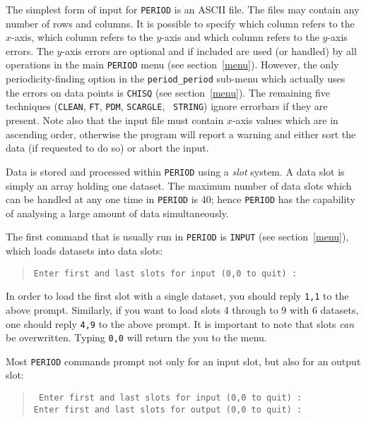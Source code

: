 The simplest form of input for {\tt PERIOD} is an ASCII file.  The
files may contain any number of rows and columns. It is possible to
specify which column refers to the $x$-axis, which column refers to
the $y$-axis and which column refers to the $y$-axis errors.
The $y$-axis errors are optional and if included are used (or handled)
by all operations in the main {\tt PERIOD} menu (see
section~\ref{menu}).  However, the only periodicity-finding option in
the {\tt period\_period} sub-menu which actually uses the errors on
data points is {\tt CHISQ} (see section~\ref{menu}). The remaining five
techniques ({\tt CLEAN}, {\tt FT}, {\tt PDM}, {\tt SCARGLE}, {\tt
STRING}) ignore errorbars if they are present. Note also that the input
file must contain $x$-axis values which are in ascending order,
otherwise the program will report a warning and either sort the data
(if requested to do so) or abort the input.

Data is stored and processed within {\tt PERIOD} using a {\em slot} system.
A data slot is simply an array holding one dataset. The maximum number
of data slots which can be handled at any one time in {\tt PERIOD} is 40;
hence {\tt PERIOD} has the capability of analysing a large amount of data
simultaneously. 

The first command that is usually run in {\tt PERIOD} is {\tt INPUT}
(see section~\ref{menu}), which loads datasets into data slots:

\begin{quote}
{\tt Enter first and last slots for input (0,0 to quit) :}
\end{quote}

In order to load the first slot with a single dataset, you should reply 
{\tt 1,1} to the above prompt. Similarly, if you want to load slots
4 through to 9 with 6 datasets, one should reply {\tt 4,9} to the above
prompt. It is important to note that slots {\em can} be overwritten.
Typing {\tt 0,0} will return the you to the menu. 

Most {\tt PERIOD} commands prompt not only for an input slot, but also for
an output slot:

\begin{quote}{\tt
Enter first and last slots for input  (0,0 to quit) : \\
Enter first and last slots for output (0,0 to quit) : }
\end{quote}

